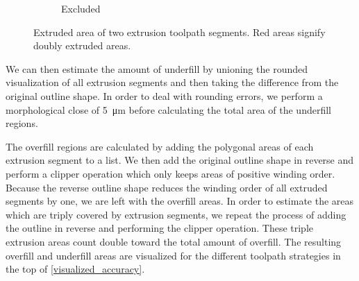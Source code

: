 \begin{figure}
\begin{subfigure}{\figwidth}
\caption{Excluded}
\end{subfigure}
\caption{
Extruded area of two extrusion toolpath segments.
Red areas signify doubly extruded areas.
}
\label{segment_visualization}
\end{figure}

We can then estimate the amount of underfill by unioning the rounded visualization of all extrusion segments and then taking the difference from the original outline shape.
In order to deal with rounding errors, we perform a morphological close of \SI{5}{\micro\meter} before calculating the total area of the underfill regions.

The overfill regions are calculated by adding the polygonal areas of each extrusion segment to a list.
We then add the original outline shape in reverse and perform a clipper operation which only keeps areas of positive winding order.
Because the reverse outline shape reduces the winding order of all extruded segments by one, we are left with the overfill areas.
In order to estimate the areas which are triply covered by extrusion segments, we repeat the process of adding the outline in reverse and performing the clipper operation.
These triple extrusion areas count double toward the total amount of overfill.
The resulting overfill and underfill areas are visualized for the different toolpath strategies in the top of \cref{visualized_accuracy}.



